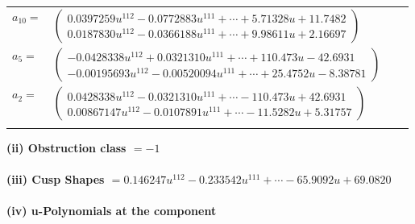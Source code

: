 \documentclass[1p]{elsarticle_modified}
\theoremstyle{definition}
\begin{document}
\begin{tabular}{m{7pt} m{180pt} m{7pt} m{180pt} }
\flushright $a_{10}=$&$\begin{pmatrix}0.0397259 u^{112}-0.0772883 u^{111}+\cdots+5.71328 u+11.7482\\0.0187830 u^{112}-0.0366188 u^{111}+\cdots+9.98611 u+2.16697\end{pmatrix}$ \\
\flushright $a_{5}=$&$\begin{pmatrix}-0.0428338 u^{112}+0.0321310 u^{111}+\cdots+110.473 u-42.6931\\-0.00195693 u^{112}-0.00520094 u^{111}+\cdots+25.4752 u-8.38781\end{pmatrix}$ \\
\flushright $a_{2}=$&$\begin{pmatrix}0.0428338 u^{112}-0.0321310 u^{111}+\cdots-110.473 u+42.6931\\0.00867147 u^{112}-0.0107891 u^{111}+\cdots-11.5282 u+5.31757\end{pmatrix}$\\&\end{tabular}
\flushleft \textbf{(ii) Obstruction class $= -1$}\\~\\
\flushleft \textbf{(iii) Cusp Shapes $= 0.146247 u^{112}-0.233542 u^{111}+\cdots-65.9092 u+69.0820$}\\~\\
\newpage\renewcommand{\arraystretch}{1}
\flushleft \textbf{(iv) u-Polynomials at the component}\newline \\
\end{document}
